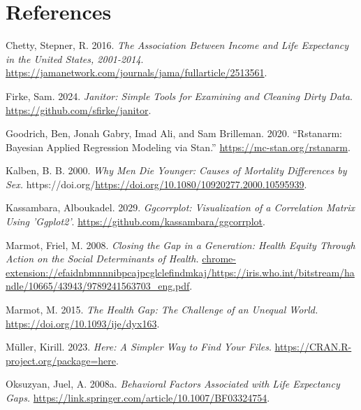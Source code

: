 \documentclass[
  letterpaper,
  DIV=11,
  numbers=noendperiod]{scrartcl}
\newlength{\cslhangindent}
\newenvironment{CSLReferences}[2] %
 {\begin{list}{}{%
  \setlength{\itemindent}{0pt}
  \setlength{\leftmargin}{0pt}
  \setlength{\parsep}{0pt}
  \ifodd #1
   \setlength{\leftmargin}{\cslhangindent}
   \setlength{\itemindent}{-1\cslhangindent}
  \fi
  \setlength{\itemsep}{#2\baselineskip}}}
 {\end{list}}
\begin{document}
\endgroup{}

\newpage

\section*{References}\label{references}

\label{refs}
\begin{CSLReferences}{1}{0}
Chetty, Stepner, R. 2016. \emph{The Association Between Income and Life
Expectancy in the United States, 2001-2014}.
\url{https://jamanetwork.com/journals/jama/fullarticle/2513561}.

Firke, Sam. 2024. \emph{Janitor: Simple Tools for Examining and Cleaning
Dirty Data}. \url{https://github.com/sfirke/janitor}.

Goodrich, Ben, Jonah Gabry, Imad Ali, and Sam Brilleman. 2020.
{``Rstanarm: {Bayesian} Applied Regression Modeling via {Stan}.''}
\url{https://mc-stan.org/rstanarm}.

Kalben, B. B. 2000. \emph{Why Men Die Younger: Causes of Mortality
Differences by Sex.}
https://doi.org/\url{https://doi.org/10.1080/10920277.2000.10595939}.

Kassambara, Alboukadel. 2029. \emph{Ggcorrplot: Visualization of a
Correlation Matrix Using 'Ggplot2'}.
\url{https://github.com/kassambara/ggcorrplot}.

Marmot, Friel, M. 2008. \emph{Closing the Gap in a Generation: Health
Equity Through Action on the Social Determinants of Health.}
\url{chrome-extension://efaidnbmnnnibpcajpcglclefindmkaj/https://iris.who.int/bitstream/handle/10665/43943/9789241563703_eng.pdf}.

Marmot, M. 2015. \emph{The Health Gap: The Challenge of an Unequal
World.} \url{https://doi.org/10.1093/ije/dyx163}.

Müller, Kirill. 2023. \emph{Here: A Simpler Way to Find Your Files}.
\url{https://CRAN.R-project.org/package=here}.

Oksuzyan, Juel, A. 2008a. \emph{Behavioral Factors Associated with Life
Expectancy Gaps.}
\url{https://link.springer.com/article/10.1007/BF03324754}.


\end{CSLReferences}
\end{document}
